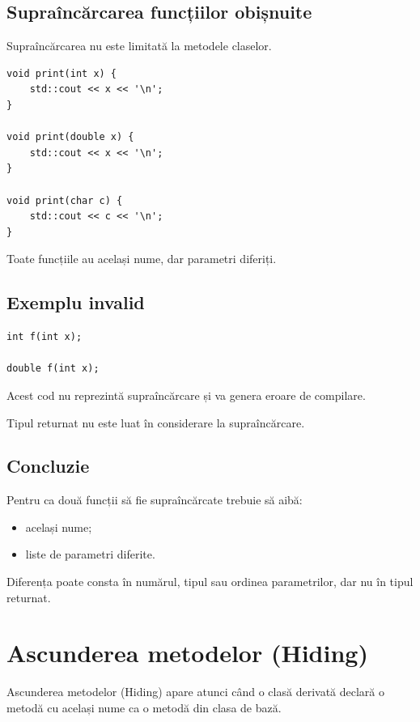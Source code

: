 \documentclass[12pt,a4paper]{article}
\begin{document}
\subsection{Supraîncărcarea funcțiilor obișnuite}

Supraîncărcarea nu este limitată la metodele claselor.

\begin{verbatim}
void print(int x) {
    std::cout << x << '\n';
}

void print(double x) {
    std::cout << x << '\n';
}

void print(char c) {
    std::cout << c << '\n';
}
\end{verbatim}

Toate funcțiile au același nume, dar parametri diferiți.

\subsection{Exemplu invalid}

\begin{verbatim}
int f(int x);

double f(int x);
\end{verbatim}

Acest cod nu reprezintă supraîncărcare și va genera eroare de compilare.

Tipul returnat nu este luat în considerare la supraîncărcare.

\subsection{Concluzie}

Pentru ca două funcții să fie supraîncărcate trebuie să aibă:

\begin{itemize}
\item același nume;
\item liste de parametri diferite.
\end{itemize}

Diferența poate consta în numărul, tipul sau ordinea parametrilor, dar nu în tipul returnat.



\section{Ascunderea metodelor (Hiding)}

Ascunderea metodelor (Hiding) apare atunci când o clasă derivată declară o metodă cu același nume ca o metodă din clasa de bază.
\end{document}
